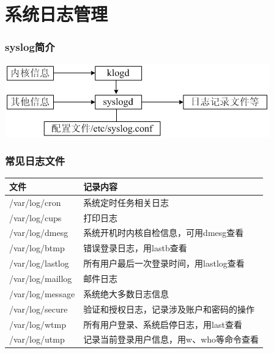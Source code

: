 \documentclass[xcolor=svgnames,presentation]{beamer}
\begin{document}
\section{系统日志管理}
\label{sec-6}
\begin{frame}
\frametitle{syslog简介}
\label{sec-6-1}

\includegraphics[width=.9\linewidth]{img/syslog.png}
\end{frame}
\begin{frame}
\frametitle{常见日志文件}
\label{sec-6-2}


\begin{center}
\begin{tabular}{ll}
 文件              &  记录内容                                  \\
\hline
 /var/log/cron     &  系统定时任务相关日志                      \\
 /var/log/cups     &  打印日志                                  \\
 /var/log/dmesg    &  系统开机时内核自检信息，可用dmesg查看     \\
 /var/log/btmp     &  错误登录日志，用lastb查看                 \\
 /var/log/lastlog  &  所有用户最后一次登录时间，用lastlog查看   \\
 /var/log/maillog  &  邮件日志                                  \\
 /var/log/message  &  系统绝大多数日志信息                      \\
 /var/log/secure   &  验证和授权日志，记录涉及账户和密码的操作  \\
 /var/log/wtmp     &  所有用户登录、系统启停日志，用last查看    \\
 /var/log/utmp     &  记录当前登录用户信息，用w、who等命令查看  \\
\end{tabular}
\end{center}
\end{frame}
\end{document}
